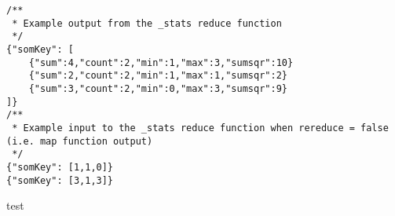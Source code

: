 \documentclass[
    parskip=full,
    a4paper
]{scrartcl}
\begin{document}
\begin{listing}[ht]
    \begin{verbatim}
/**
 * Example output from the _stats reduce function
 */
{"somKey": [
    {"sum":4,"count":2,"min":1,"max":3,"sumsqr":10}
    {"sum":2,"count":2,"min":1,"max":1,"sumsqr":2}
    {"sum":3,"count":2,"min":0,"max":3,"sumsqr":9}
]}
/**
 * Example input to the _stats reduce function when rereduce = false (i.e. map function output)
 */
{"somKey": [1,1,0]}
{"somKey": [3,1,3]}
    \end{verbatim}
    \caption{test}
    \label{stats-reduce-fn}
\end{listing}
\end{document}
